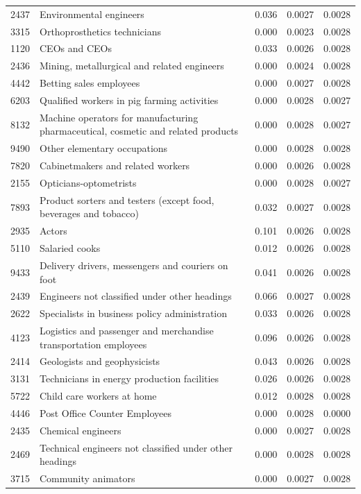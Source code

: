 \begin{longtable}{p{}>{\raggedright\arraybackslash}p{}rrr}
2437 & Environmental engineers & 0.036 & 0.0027 & 0.0028 \\
3315 & Orthoprosthetics technicians & 0.000 & 0.0023 & 0.0028 \\
1120 & CEOs and CEOs & 0.033 & 0.0026 & 0.0028 \\
2436 & Mining, metallurgical and related engineers & 0.000 & 0.0024 & 0.0028 \\
4442 & Betting sales employees & 0.000 & 0.0027 & 0.0028 \\
6203 & Qualified workers in pig farming activities & 0.000 & 0.0028 & 0.0027 \\
8132 & Machine operators for manufacturing pharmaceutical, cosmetic and related products & 0.000 & 0.0028 & 0.0027 \\
9490 & Other elementary occupations & 0.000 & 0.0028 & 0.0028 \\
7820 & Cabinetmakers and related workers & 0.000 & 0.0026 & 0.0028 \\
2155 & Opticians-optometrists & 0.000 & 0.0028 & 0.0027 \\
7893 & Product sorters and testers (except food, beverages and tobacco) & 0.032 & 0.0027 & 0.0028 \\
2935 & Actors & 0.101 & 0.0026 & 0.0028 \\
5110 & Salaried cooks & 0.012 & 0.0026 & 0.0028 \\
9433 & Delivery drivers, messengers and couriers on foot & 0.041 & 0.0026 & 0.0028 \\
2439 & Engineers not classified under other headings & 0.066 & 0.0027 & 0.0028 \\
2622 & Specialists in business policy administration & 0.033 & 0.0026 & 0.0028 \\
4123 & Logistics and passenger and merchandise transportation employees & 0.096 & 0.0026 & 0.0028 \\
2414 & Geologists and geophysicists & 0.043 & 0.0026 & 0.0028 \\
3131 & Technicians in energy production facilities & 0.026 & 0.0026 & 0.0028 \\
5722 & Child care workers at home & 0.012 & 0.0028 & 0.0028 \\
4446 & Post Office Counter Employees & 0.000 & 0.0028 & 0.0000 \\
2435 & Chemical engineers & 0.000 & 0.0027 & 0.0028 \\
2469 & Technical engineers not classified under other headings & 0.000 & 0.0028 & 0.0028 \\
3715 & Community animators & 0.000 & 0.0027 & 0.0028 \\

\end{longtable}
